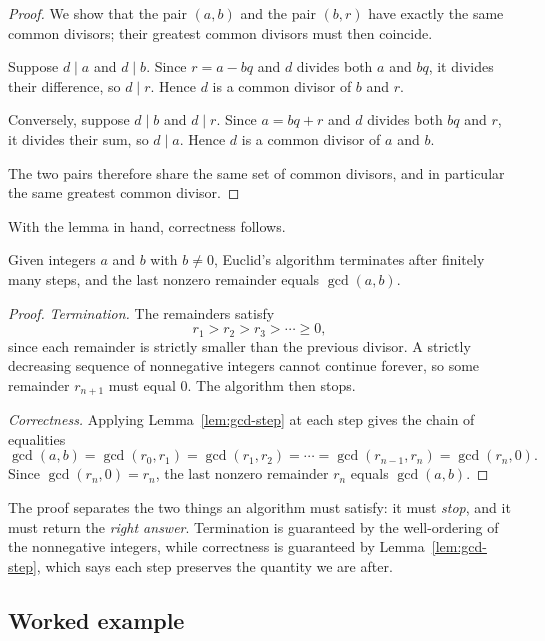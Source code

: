 \begin{proof}
We show that the pair $(a, b)$ and the pair $(b, r)$ have exactly the same common divisors; their greatest common divisors must then coincide.

Suppose $d \mid a$ and $d \mid b$. Since $r = a - bq$ and $d$ divides both $a$ and $bq$, it divides their difference, so $d \mid r$. Hence $d$ is a common divisor of $b$ and $r$.

Conversely, suppose $d \mid b$ and $d \mid r$. Since $a = bq + r$ and $d$ divides both $bq$ and $r$, it divides their sum, so $d \mid a$. Hence $d$ is a common divisor of $a$ and $b$.

The two pairs therefore share the same set of common divisors, and in particular the same greatest common divisor.
\end{proof}

With the lemma in hand, correctness follows.

\begin{theorem}\label{thm:euclid}
Given integers $a$ and $b$ with $b \neq 0$, Euclid's algorithm terminates after finitely many steps, and the last nonzero remainder equals $\gcd(a, b)$.
\end{theorem}

\begin{proof}
\emph{Termination.} The remainders satisfy
\[
r_1 > r_2 > r_3 > \cdots \geq 0,
\]
since each remainder is strictly smaller than the previous divisor. A strictly decreasing sequence of nonnegative integers cannot continue forever, so some remainder $r_{n+1}$ must equal $0$. The algorithm then stops.

\emph{Correctness.} Applying Lemma~\ref{lem:gcd-step} at each step gives the chain of equalities
\[
\gcd(a, b) = \gcd(r_0, r_1) = \gcd(r_1, r_2) = \cdots = \gcd(r_{n-1}, r_n) = \gcd(r_n, 0).
\]
Since $\gcd(r_n, 0) = r_n$, the last nonzero remainder $r_n$ equals $\gcd(a, b)$.
\end{proof}

\begin{remark}
The proof separates the two things an algorithm must satisfy: it must \emph{stop}, and it must return the \emph{right answer}. Termination is guaranteed by the well-ordering of the nonnegative integers, while correctness is guaranteed by Lemma~\ref{lem:gcd-step}, which says each step preserves the quantity we are after.
\end{remark}

\subsection{Worked example}

